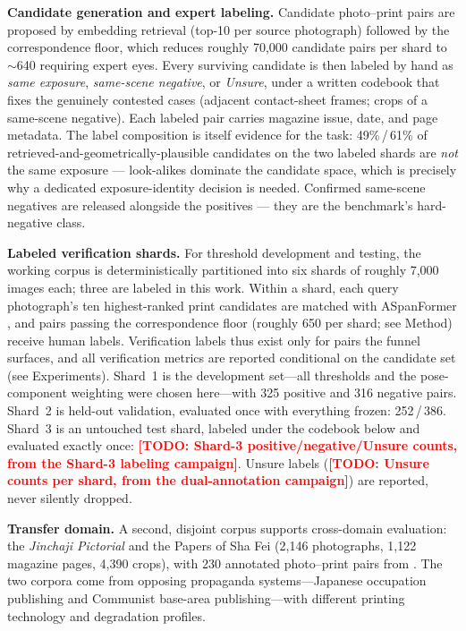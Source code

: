 \documentclass[letterpaper]{article} %
\newcommand{\todo}[1]{\textcolor{red}{\textbf{[TODO: #1]}}}
\begin{document}
\textbf{Candidate generation and expert labeling.} Candidate photo--print
pairs are proposed by embedding retrieval (top-10 per source photograph)
followed by the correspondence floor, which reduces roughly 70{,}000
candidate pairs per shard to $\sim$640 requiring expert eyes. Every
surviving candidate is then labeled by hand as \emph{same exposure},
\emph{same-scene negative}, or \emph{Unsure}, under a written codebook that
fixes the genuinely contested cases (adjacent contact-sheet frames; crops of
a same-scene negative). Each labeled pair carries magazine issue, date, and
page metadata. The label composition is itself evidence for the task:
49\%\,/\,61\% of retrieved-and-geometrically-plausible candidates on the two
labeled shards are \emph{not} the same exposure --- look-alikes dominate the
candidate space, which is precisely why a dedicated exposure-identity
decision is needed. Confirmed same-scene negatives are released alongside
the positives --- they are the benchmark's hard-negative class.

\textbf{Labeled verification shards.} For threshold development and testing,
the working corpus is deterministically partitioned into six shards of
roughly 7{,}000 images each; three are labeled in this work. Within a shard,
each query photograph's ten highest-ranked print candidates are matched with
ASpanFormer \cite{chen2022aspanformer}, and pairs passing the correspondence
floor (roughly 650 per shard; see Method) receive human labels. Verification
labels thus exist only for pairs the funnel surfaces, and all verification
metrics are reported conditional on the candidate set (see Experiments).
Shard~1 is the development set---all thresholds and the pose-component
weighting were chosen here---with 325 positive and 316 negative pairs.
Shard~2 is held-out validation, evaluated once with everything frozen:
252\,/\,386. Shard~3 is an untouched test shard, labeled under the codebook
below and evaluated exactly once: \todo{Shard-3 positive/negative/Unsure
counts, from the Shard-3 labeling campaign}. Unsure labels (\todo{Unsure
counts per shard, from the dual-annotation campaign}) are reported, never
silently dropped.

\textbf{Transfer domain.} A second, disjoint corpus supports cross-domain
evaluation: the \emph{Jinchaji Pictorial} and the Papers of Sha Fei (2{,}146
photographs, 1{,}122 magazine pages, 4{,}390 crops), with 230 annotated
photo--print pairs from \citet{du2024probing}. The two corpora come from
opposing propaganda
systems---Japanese occupation publishing and Communist base-area
publishing---with different printing technology and degradation profiles.
\end{document}
